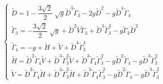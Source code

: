 \begin{equation}\label{parquet}
    \left\{
    \begin{array}{l}
        \widetilde D=1-\dfrac{3\sqrt 2}{2}\;\sqrt{g} \widetilde D^3\widetilde \Gamma_3-2g\widetilde D^2-g\widetilde D^4\widetilde \Gamma_4
        \\
        \widetilde \Gamma_3=-\dfrac{3\sqrt 2}{2}\;\sqrt{g}+\widetilde D^2\widetilde V\widetilde \Gamma_3+\widetilde D^3\widetilde \Gamma_3^3-
        g\widetilde \Gamma_3\widetilde D^2
        \\
        \widetilde \Gamma_4=-g+\widetilde H+\widetilde V+\widetilde D^4\widetilde \Gamma_3^4
        \\
        \widetilde H=\widetilde D^2\widetilde \Gamma_4\widetilde V+\widetilde D^3\widetilde \Gamma_3^2\widetilde V+
        \widetilde D^3\widetilde \Gamma_4\widetilde \Gamma_3^2-g\widetilde D^2\widetilde \Gamma_4-
        g\widetilde D^3\widetilde \Gamma^2_3
        \\
        \widetilde V=\widetilde D^2\widetilde \Gamma_4\widetilde H+\widetilde D^3\widetilde \Gamma_3^2\widetilde H+\widetilde D^3
        \widetilde \Gamma_4\widetilde \Gamma_3^2-g\widetilde D^2\widetilde \Gamma_4-
        g\widetilde D^3\widetilde \Gamma^2_3
    \end{array}
    \right.
\end{equation}

